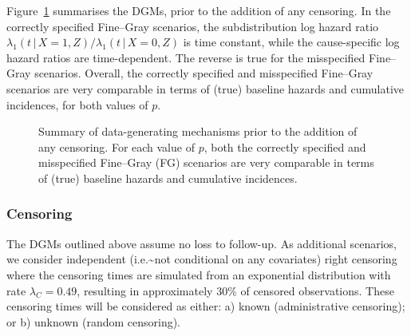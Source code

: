\documentclass[
  letterpaper,
  paper=240mm:170mm,
  twoside=true,
  open=right,
  fontsize=10pt,
  pagesize=false,
  BCOR=15mm,
  DIV=14,
  headinclude=true,
  footinclude=false,
  headsepline=on]{scrbook}
\newcommand{\given}{\,|\,}
\begin{document}
Figure~\ref{fig-scenarios-vis} summarises the DGMs, prior to the
addition of any censoring. In the correctly specified Fine--Gray
scenarios, the subdistribution log hazard ratio
\(\lambda_1(t \given X = 1, Z)/\lambda_1(t \given X = 0, Z)\) is time
constant, while the cause-specific log hazard ratios are time-dependent.
The reverse is true for the misspecified Fine--Gray scenarios. Overall,
the correctly specified and misspecified Fine--Gray scenarios are very
comparable in terms of (true) baseline hazards and cumulative
incidences, for both values of \(p\).

\begin{figure}


\caption{\label{fig-scenarios-vis}Summary of data-generating mechanisms
prior to the addition of any censoring. For each value of \(p\), both
the correctly specified and misspecified Fine--Gray (FG) scenarios are
very comparable in terms of (true) baseline hazards and cumulative
incidences.}

\end{figure}%

\subsubsection{Censoring}\label{censoring}

The DGMs outlined above assume no loss to follow-up. As additional
scenarios, we consider independent (i.e.\textasciitilde not conditional
on any covariates) right censoring where the censoring times are
simulated from an exponential distribution with rate
\(\lambda_C = 0.49\), resulting in approximately 30\% of censored
observations. These censoring times will be considered as either: a)
known (administrative censoring); or b) unknown (random censoring).
\end{document}
